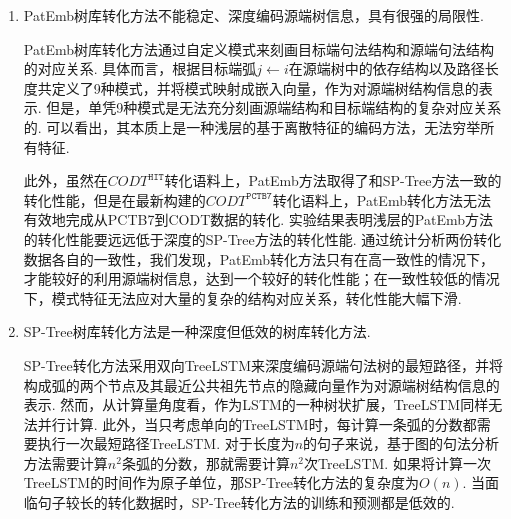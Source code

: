 \begin{enumerate}
    \item PatEmb树库转化方法不能稳定、深度编码源端树信息，具有很强的局限性.

          PatEmb树库转化方法通过自定义模式来刻画目标端句法结构和源端句法结构的对应关系. 具体而言，根据目标端弧$j \leftarrow i$在源端树中的依存结构以及路径长度共定义了9种模式，并将模式映射成嵌入向量，作为对源端树结构信息的表示. 但是，单凭9种模式是无法充分刻画源端结构和目标端结构的复杂对应关系的. 可以看出，其本质上是一种浅层的基于离散特征的编码方法，无法穷举所有特征.

          此外，虽然在$CODT^{\texttt{HIT}}$转化语料上，PatEmb方法取得了和SP-Tree方法一致的转化性能，但是在最新构建的$CODT^{\texttt{PCTB7}}$转化语料上，PatEmb转化方法无法有效地完成从PCTB7到CODT数据的转化. 实验结果表明浅层的PatEmb方法的转化性能要远远低于深度的SP-Tree方法的转化性能. 通过统计分析两份转化数据各自的一致性，我们发现，PatEmb转化方法只有在高一致性的情况下，才能较好的利用源端树信息，达到一个较好的转化性能；在一致性较低的情况下，模式特征无法应对大量的复杂的结构对应关系，转化性能大幅下滑.

    \item SP-Tree树库转化方法是一种深度但低效的树库转化方法.

          SP-Tree转化方法采用双向TreeLSTM来深度编码源端句法树的最短路径，并将构成弧的两个节点及其最近公共祖先节点的隐藏向量作为对源端树结构信息的表示. 然而，从计算量角度看，作为LSTM的一种树状扩展，TreeLSTM同样无法并行计算. 此外，当只考虑单向的TreeLSTM时，每计算一条弧的分数都需要执行一次最短路径TreeLSTM. 对于长度为$n$的句子来说，基于图的句法分析方法需要计算$n^2$条弧的分数，那就需要计算$n^2$次TreeLSTM. 如果将计算一次TreeLSTM的时间作为原子单位，那SP-Tree转化方法的复杂度为$O(n)$. 当面临句子较长的转化数据时，SP-Tree转化方法的训练和预测都是低效的.


\end{enumerate}
